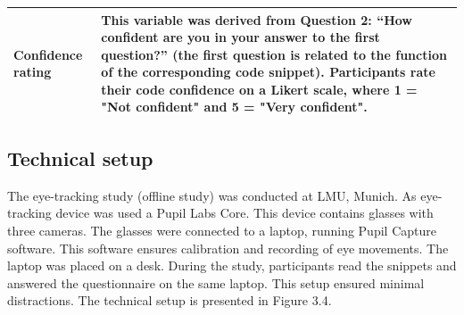 \begin{longtable}{|p{5.5cm}|p{8.5cm}|}
\parbox[t]{5.5cm}{\vspace{0.3em}Confidence rating\vspace{0.5em}} &
\parbox[t]{8.5cm}{\vspace{0.3em}This variable was derived from Question 2: “How confident are you in your answer to the first question?” (the first question is related to the function of the corresponding code snippet). Participants rate their code confidence on a Likert scale, where 1 = "Not confident" and 5 = "Very confident".\vspace{0.5em}} \\
\hline

\end{longtable}


\subsection{Technical setup}


The eye-tracking study (offline study) was conducted at LMU, Munich. As eye-tracking device was used a Pupil Labs Core. This device contains glasses with three cameras. The glasses were connected to a laptop, running Pupil Capture software. This software ensures calibration and recording of eye movements. The laptop was placed on a desk. During the study, participants read the snippets and answered the questionnaire on the same laptop. This setup ensured minimal distractions. The technical setup is presented in Figure 3.4. 

